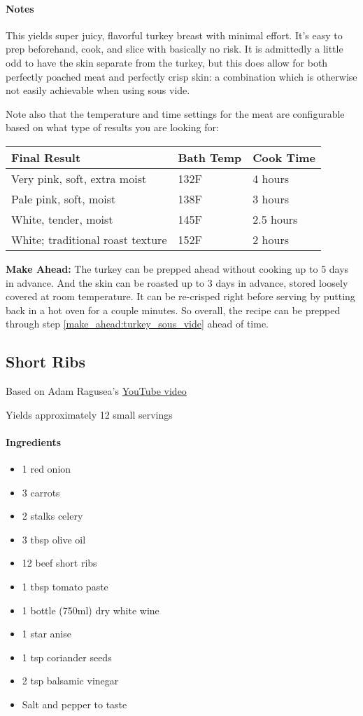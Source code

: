 \documentclass[12pt]{article}
\newenvironment*{ingredients}
	{
		\paragraph*{Ingredients}
		\begin{itemize}
	}
	{
		\end{itemize}
	}
\newenvironment*{notes}
	{
		\paragraph*{Notes}
		\begin{adjustwidth}{1cm}{}
	}
	{
		\end{adjustwidth}
	}
\begin{document}
	\begin{notes}
		This yields super juicy, flavorful turkey breast with minimal effort. It's easy to prep beforehand, cook, and slice with basically no risk. It is admittedly a little odd to have the skin separate from the turkey, but this does allow for both perfectly poached meat and perfectly crisp skin: a combination which is otherwise not easily achievable when using sous vide.
		
		Note also that the temperature and time settings for the meat are configurable based on what type of results you are looking for:
		
		\begin{tabular}{|p{2.5in}|p{1in}|p{1in}|}
			\hline
			\textbf{Final Result} & \textbf{Bath Temp} & \textbf{Cook Time} \\\hline
			Very pink, soft, extra moist & 132F & 4 hours \\\hline
			Pale pink, soft, moist  & 138F & 3 hours \\\hline
			White, tender, moist & 145F & 2.5 hours \\\hline
			White; traditional roast texture & 152F & 2 hours \\\hline
		\end{tabular}
		
		\textbf{Make Ahead:} The turkey can be prepped ahead without cooking up to 5 days in advance. And the skin can be roasted up to 3 days in advance, stored loosely covered at room temperature. It can be re-crisped right before serving by putting back in a hot oven for a couple minutes. So overall, the recipe can be prepped through step \ref{make_ahead:turkey_sous_vide} ahead of time.
	\end{notes}
	
	\newpage
	
	\subsection{Short Ribs}
	Based on Adam Ragusea's \href{https://www.youtube.com/watch?v=BFaQbSlDM0k}{YouTube video}
	
	Yields approximately 12 small servings
	
	\begin{ingredients}
		\item 1 red onion
		\item 3 carrots
		\item 2 stalks celery
		\item 3 tbsp olive oil
		\item 12 beef short ribs
		\item 1 tbsp tomato paste
		\item 1 bottle (750ml) dry white wine
		\item 1 star anise
		\item 1 tsp coriander seeds
		\item 2 tsp balsamic vinegar
		\item Salt and pepper to taste
	\end{ingredients}
	
\end{document}
